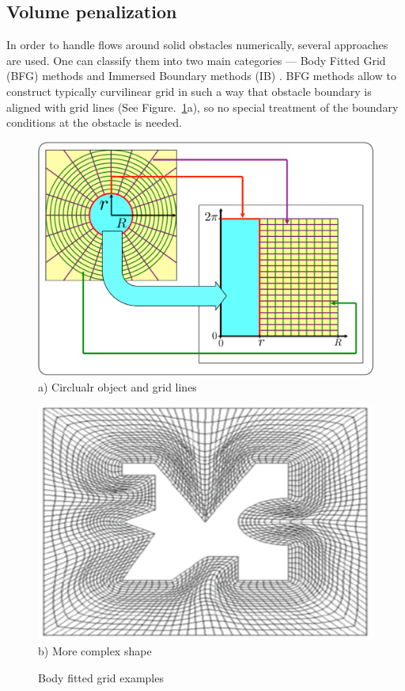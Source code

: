 \subsection{Volume penalization}
In order to handle flows around solid obstacles numerically, several approaches are used. One can classify them into two main categories --- Body Fitted Grid (BFG) methods and Immersed Boundary methods (IB) \cite{lib:ib_peskin}. BFG methods allow to construct typically curvilinear grid in such a way that obstacle boundary is aligned with grid lines (See Figure.~\ref{fig:radial2rect}a), so no special treatment of the boundary conditions at the obstacle is needed.
\begin{figure}[h]
\begin{minipage}{0.5\linewidth}
\includegraphics[width=\linewidth]{fig/radial2rect.pdf}
a) Circlualr object and grid lines \label{fig:radial2rect_a}
\end{minipage}
\begin{minipage}{0.5\linewidth}
\includegraphics[width=\linewidth]{fig/weird_shape.pdf}
\centering b) More complex shape \label{fig:radial2rect_b}
\end{minipage}
\caption{Body fitted grid examples} \label{fig:radial2rect}
\end{figure}\\
